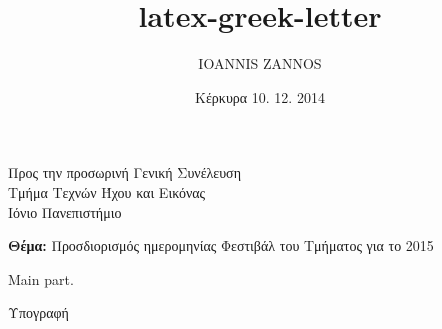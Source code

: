 \documentclass[nofonts]{tufte-handout}
\author{IOANNIS ZANNOS}
\date{Κέρκυρα 10. 12. 2014}
\title{latex-greek-letter}
\begin{document}
\maketitle
\tableofcontents

{Προς την προσωρινή Γενική Συνέλευση \\
Τμήμα Τεχνών Ήχου και Εικόνας \\
Ιόνιο Πανεπιστήμιο}

\opening{\textbf{Θέμα:} Προσδιορισμός ημερομηνίας Φεστιβάλ του Τμήματος για το 2015}

Main part.

\closing{Υπογραφή}
\end{document}
